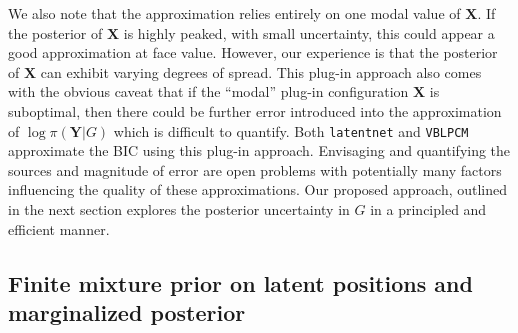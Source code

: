 \documentclass[12pt]{article}
\newcommand{\bX}{{\mathbf{X}}}
\newcommand{\bY}{{\mathbf{Y}}}
\begin{document}
We also note that the approximation relies entirely on one modal value of $\bX$. If the posterior of $\bX$ is highly peaked, with small uncertainty, this could appear a good approximation at face value. However, our experience is that the posterior of $\bX$ can exhibit varying degrees of spread. This plug-in approach also comes with the obvious caveat that if the ``modal'' plug-in configuration $\bX$ is suboptimal, then there could be further error introduced into the approximation of $\log \pi(\bY|G)$ which is difficult to quantify. Both \texttt{latentnet} and \texttt{VBLPCM} approximate the BIC using this plug-in approach. Envisaging and quantifying the sources and magnitude of error are open problems with potentially many factors influencing the quality of these approximations. Our proposed approach, outlined in the next section explores the posterior uncertainty in $G$ in a principled and efficient manner.





\subsection{Finite mixture prior on latent positions and marginalized posterior}\label{sec:cprior}
\end{document}

